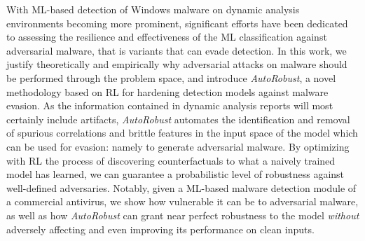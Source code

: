 With ML-based detection of Windows malware on dynamic analysis environments becoming more prominent,  significant efforts have been dedicated to assessing the resilience and effectiveness of the ML classification against adversarial malware, that is variants that can evade detection.
In this work, we justify theoretically and empirically why adversarial attacks on malware should be performed through the problem space, and introduce \textit{AutoRobust}, a novel methodology based on \gls{RL} for hardening detection models against malware evasion.
As the information contained in dynamic analysis reports will most certainly include artifacts, \textit{AutoRobust} automates the identification and removal of spurious correlations and brittle features in the input space of the model which can be used for evasion: namely to generate adversarial malware.
By optimizing with \gls{RL} the process of discovering counterfactuals to what a naively trained model has learned, we can guarantee a probabilistic level of robustness against well-defined adversaries.
Notably, given a ML-based malware detection module of a commercial antivirus, we show how vulnerable it can be to adversarial malware, as well as how \textit{AutoRobust} can grant near perfect robustness to the model \textit{without} adversely affecting and even improving its performance on clean inputs.